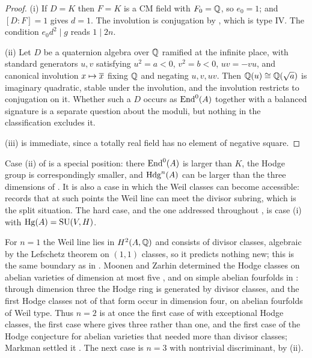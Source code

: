 \begin{proof}
(i) If $D=K$ then $F=K$ is a CM field with $F_{0}=\mathbb{Q}$, so $e_{0}=1$; and
$[D:F]=1$ gives $d=1$. The involution is conjugation by
, which is type IV. The condition $e_{0}d^{2}\mid g$ reads
$1\mid 2n$.

(ii) Let $D$ be a quaternion algebra over $\mathbb{Q}$ ramified at the infinite place,
with standard generators $u,v$ satisfying $u^{2}=a<0$, $v^{2}=b<0$, $uv=-vu$,
and canonical involution $x\mapsto\overline{x}$ fixing $\mathbb{Q}$ and negating
$u,v,uv$. Then $\mathbb{Q}(u)\cong\mathbb{Q}(\sqrt{a})$ is imaginary quadratic, stable under
the involution, and the involution restricts to conjugation on it. Whether
such a $D$ occurs as $\operatorname{End}^{0}(A)$ together with a balanced signature
is a separate question about the moduli, but nothing in the classification
excludes it.

(iii) is immediate, since a totally real field has no element of negative
square.
\end{proof}

\begin{remark}\label{rem:genericcase}
Case (ii) of  is a special position: there
$\operatorname{End}^{0}(A)$ is larger than $K$, the Hodge group is correspondingly smaller,
and $\mathrm{Hdg}^{n}(A)$ can be larger than the three dimensions of
. It is also a case in which the Weil classes can become
accessible:  records that at such points the Weil line can
meet the divisor subring, which is the split situation. The hard case, and the
one addressed throughout , is
case (i) with $\operatorname{Hg}(A)=\operatorname{SU}(V,H)$.
\end{remark}

\begin{remark}\label{rem:dimfour}
For $n=1$ the Weil line lies in $H^{2}(A,\mathbb{Q})$ and consists of divisor
classes, algebraic by the Lefschetz theorem on $(1,1)$ classes, so it predicts
nothing new; this is the same boundary as in . Moonen and
Zarhin determined the Hodge classes on abelian varieties of dimension at most
five \cite{MZ99}, and on simple abelian fourfolds in \cite{MZ95}: through
dimension three the Hodge ring is generated by divisor classes, and the first
Hodge classes not of that form occur in dimension four, on abelian fourfolds of
Weil type. Thus $n=2$ is at once the first case of  with
exceptional Hodge classes, the first case where  gives
three rather than one, and the first case of the Hodge conjecture for
abelian varieties that needed more than divisor classes; Markman settled it
\cite[Corollary 1.6.1]{Mar25a}. The next case is $n=3$ with nontrivial
discriminant, by (ii).
\end{remark}
